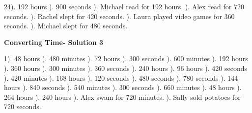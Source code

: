 \documentclass{article}%
\begin{document}
24). 192 hours%
). 900 seconds%
). Michael read for 192 hours.%
). Alex read for 720 seconds.%
). Rachel slept for 420 seconds.%
). Laura played video games for 360 seconds.%
). Michael slept for 480 seconds.%
\newline%
\newpage%
\large%
\begin{center}%
\textbf{Converting Time- Solution 3}%
\newline%
\end{center} \normalsize%
1). 48 hours%
). 480 minutes%
). 72 hours%
). 300 seconds%
). 600 minutes%
). 192 hours%
). 360 hours%
). 300 minutes%
). 360 seconds%
). 240 hours%
). 96 hours%
). 420 seconds%
). 420 minutes%
). 168 hours%
). 120 seconds%
). 480 seconds%
). 780 seconds%
). 144 hours%
). 840 seconds%
). 540 minutes%
). 300 seconds%
). 660 minutes%
). 48 hours%
). 264 hours%
). 240 hours%
). Alex swam for 720 minutes.%
). Sally sold potatoes for 720 seconds.%
\newline%
\end{document}
